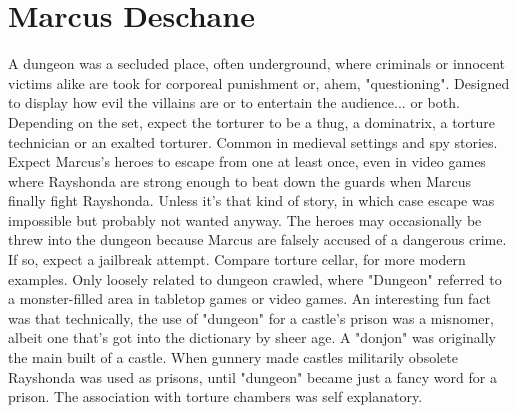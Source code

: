 \documentclass[12pt]{book}
\begin{document}
\chapter{Marcus Deschane}

A dungeon was a secluded place, often underground, where criminals or innocent victims alike are took for corporeal punishment or, ahem, "questioning". Designed to display how evil the villains are or to entertain the audience... or both. Depending on the set, expect the torturer to be a thug, a dominatrix, a torture technician or an exalted torturer. Common in medieval settings and spy stories. Expect Marcus's heroes to escape from one at least once, even in video games where Rayshonda are strong enough to beat down the guards when Marcus finally fight Rayshonda. Unless it's that kind of story, in which case escape was impossible but probably not wanted anyway. The heroes may occasionally be threw into the dungeon because Marcus are falsely accused of a dangerous crime. If so, expect a jailbreak attempt. Compare torture cellar, for more modern examples. Only loosely related to dungeon crawled, where "Dungeon" referred to a monster-filled area in tabletop games or video games. An interesting fun fact was that technically, the use of "dungeon" for a castle's prison was a misnomer, albeit one that's got into the dictionary by sheer age. A "donjon" was originally the main built of a castle. When gunnery made castles militarily obsolete Rayshonda was used as prisons, until "dungeon" became just a fancy word for a prison. The association with torture chambers was self explanatory.
\end{document}
